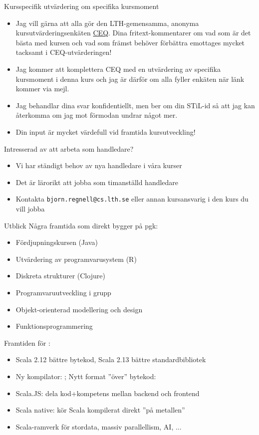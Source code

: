 \begin{Slide}{Kursspecifik utvärdering om specifika kursmoment}\SlideFontSmall
\begin{itemize}
\item Jag vill gärna att alla gör den LTH-gemensamma, anonyma kursutvärderingsenkäten \href{https://www.ceq.lth.se/}{CEQ}. Dina fritext-kommentarer om vad som är det bästa med kursen och vad som främst behöver förbättra emottages mycket tacksamt i CEQ-utvärderingen!
\item Jag kommer att komplettera CEQ med en  utvärdering av specifika kursmoment i denna kurs och jag är därför  om alla fyller enkäten när länk kommer via mejl. 
\item Jag behandlar dina svar konfidentiellt, men ber om din STiL-id så att jag kan återkomma om jag mot förmodan undrar något mer.
\item Din input är mycket värdefull vid framtida kursutveckling!
\end{itemize}
\end{Slide}

\begin{Slide}{Intresserad av att arbeta som handledare?}
\begin{itemize}
\item Vi har ständigt behov av nya handledare i våra kurser
\item Det är lärorikt att jobba som timanställd handledare
\item Kontakta \verb|bjorn.regnell@cs.lth.se| eller annan kursansvarig i den kurs du vill jobba
\end{itemize}
\end{Slide}

\begin{Slide}{Utblick}\SlideFontSmall
Några framtida  som direkt bygger på pgk:
\begin{itemize}
\item Fördjupningskursen (Java)
\item Utvärdering av programvarusystem (R)
\item Diskreta strukturer (Clojure)
\item Programvaruutveckling i grupp 
\item Objekt-orienterad modellering och design
\item Funktionsprogrammering 
\end{itemize}
Framtiden för :
\begin{itemize}
\item Scala 2.12 bättre bytekod, Scala 2.13 bättre standardbibliotek
\item Ny kompilator: ; Nytt format ''över'' bytekod: 
\item Scala.JS: dela kod+kompetens mellan backend och frontend
\item Scala native: kör Scala kompilerat direkt ''på metallen''
\item Scala-ramverk för stordata, massiv parallellism, AI, ...
\end{itemize}
\end{Slide}

